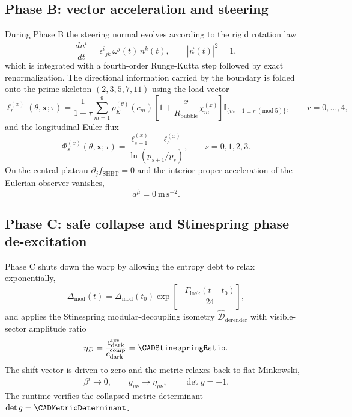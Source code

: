 \subsection{Phase B: vector acceleration and steering}

During Phase B the steering normal evolves according to the rigid rotation
law
\begin{equation}
  \frac{d n^i}{dt}
  =
  \epsilon^{i}{}_{jk}\,\omega^j(t)\,n^k(t),
  \qquad
  |\vec n(t)|^2=1,
  \label{eq:phase-b-steering}
\end{equation}
which is integrated with a fourth-order Runge-Kutta step followed by exact
renormalization.  The directional information carried by the boundary is folded
onto the prime skeleton $(2,3,5,7,11)$ using the load vector
\begin{equation}
  \ell_r^{(x)}(\theta,\boldsymbol{x};\tau)
  =
  \frac{1}{1+\tau}
  \sum_{m=1}^{9}
  \rho_E^{(\theta)}(c_m)
  \left[
    1+
    \frac{x}{R_{\mathrm{bubble}}}
    \chi_m^{(x)}
  \right]
  \mathbb I_{\{m-1\equiv r\;(\mathrm{mod}\;5)\}},
  \qquad
  r=0,\dots,4,
  \label{eq:prime-load-vector}
\end{equation}
and the longitudinal Euler flux
\begin{equation}
  \Phi_s^{(x)}(\theta,\boldsymbol{x};\tau)
  =
  \frac{\ell_{s+1}^{(x)}-\ell_s^{(x)}}{\ln(p_{s+1}/p_s)},
  \qquad
  s=0,1,2,3.
  \label{eq:longitudinal-euler-flux}
\end{equation}
On the central plateau $\partial_j f_{\mathrm{SHBT}}=0$ and the interior
proper acceleration of the Eulerian observer vanishes,
\begin{equation}
  a^{\hat\mu}=0\ \mathrm{m\,s^{-2}}.
  \label{eq:zero-proper-acceleration}
\end{equation}

\subsection{Phase C: safe collapse and Stinespring phase de-excitation}

Phase C shuts down the warp by allowing the entropy debt to relax
exponentially,
\begin{equation}
  \Delta_{\mathrm{mod}}(t)
  =
  \Delta_{\mathrm{mod}}(t_0)
  \exp\!\left[-\frac{\Gamma_{\mathrm{lock}}(t-t_0)}{24}\right],
  \label{eq:entropy-debt-decay}
\end{equation}
and applies the Stinespring modular-decoupling isometry
$\hat{\mathcal D}_{\mathrm{derender}}$ with visible-sector amplitude ratio
\begin{equation}
  \eta_D
  =
  \frac{c_{\mathrm{dark}}^{\mathrm{res}}}{c_{\mathrm{dark}}^{\mathrm{comp}}}
  =
  \CADStinespringRatio.
  \label{eq:stinespring-ratio}
\end{equation}
The shift vector is driven to zero and the metric relaxes back to flat
Minkowski,
\begin{equation}
  \beta^i\to0,
  \qquad
  g_{\mu\nu}\to\eta_{\mu\nu},
  \qquad
  \det g=-1.
  \label{eq:phase-c-collapse}
\end{equation}
The runtime verifies the collapsed metric determinant
$\det g=\CADMetricDeterminant$.
